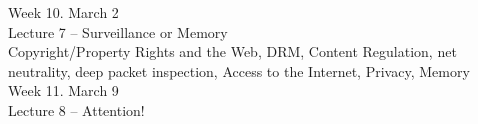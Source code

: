 \documentclass[10pt]{article}
\begin{document}
{Week 10. March 2 \\
Lecture 7 – Surveillance or Memory \\
Copyright/Property Rights and the Web, DRM, Content Regulation, net neutrality, deep packet inspection, Access to the Internet, Privacy, Memory \\

Week 11. March 9 \\
Lecture 8 – Attention! \\

%

}
\end{document}
